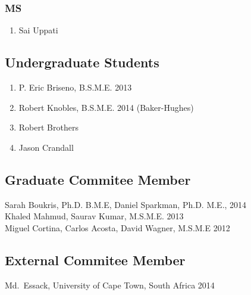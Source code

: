 \subsubsection*{MS}
\begin{enumerate}
  \item Sai Uppati
\end{enumerate}

\subsection*{Undergraduate Students}
  \begin{enumerate}
    \item P. Eric Briseno, B.S.M.E. 2013
    \item Robert Knobles, B.S.M.E. 2014 (Baker-Hughes)
    \item Robert Brothers
    \item Jason Crandall
  \end{enumerate}

\subsection*{Graduate Commitee Member}
Sarah Boukris, Ph.D. B.M.E, Daniel Sparkman, Ph.D. M.E., 2014 \\
Khaled Mahmud, Saurav Kumar, M.S.M.E. 2013 \\
Miguel Cortina, Carlos Acosta, David Wagner, M.S.M.E 2012 
\subsection*{External Commitee Member}
Md.~Essack, University of Cape Town, South Africa 2014


